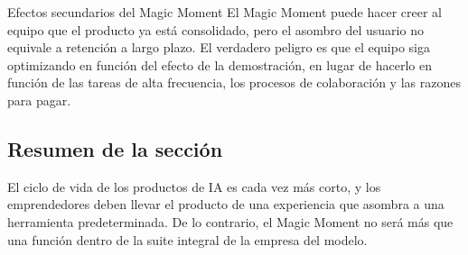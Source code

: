 \begin{warningbox}{Efectos secundarios del Magic Moment}
El Magic Moment puede hacer creer al equipo que el producto ya está consolidado, pero el asombro del usuario no equivale a retención a largo plazo. El verdadero peligro es que el equipo siga optimizando en función del efecto de la demostración, en lugar de hacerlo en función de las tareas de alta frecuencia, los procesos de colaboración y las razones para pagar.
\end{warningbox}

\subsection{Resumen de la sección}

El ciclo de vida de los productos de IA es cada vez más corto, y los emprendedores deben llevar el producto de una experiencia que asombra a una herramienta predeterminada. De lo contrario, el Magic Moment no será más que una función dentro de la suite integral de la empresa del modelo.
